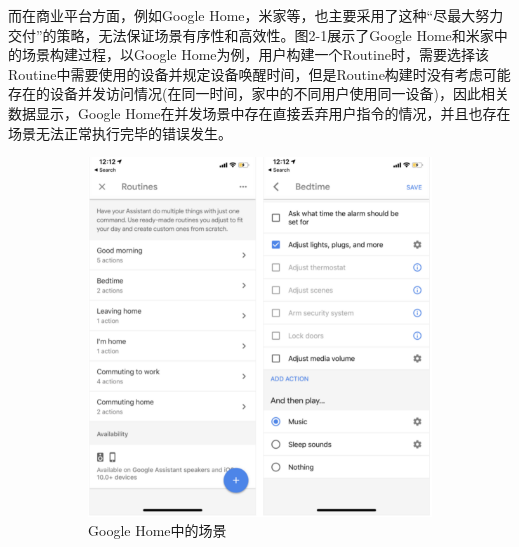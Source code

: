 \documentclass[winfonts,master,twoside]{njuthesis}
\begin{document}
而在商业平台方面，例如Google Home\cite{googlehome}，米家\cite{homemi}等，也主要采用了这种“尽最大努力交付”的策略，无法保证场景有序性和高效性\cite{celik2018soteria}。图2-1展示了Google Home和米家中的场景构建过程，以Google Home为例，用户构建一个Routine时，需要选择该Routine中需要使用的设备并规定设备唤醒时间，但是Routine构建时没有考虑可能存在的设备并发访问情况(在同一时间，家中的不同用户使用同一设备)，因此相关数据显示，Google Home在并发场景中存在直接丢弃用户指令的情况\cite{notworking}，并且也存在场景无法正常执行完毕的错误发生\cite{error}。
\begin{figure}[H]
	\begin{subfigure}{.5\textwidth}
		\centering
		\includegraphics[width=1\textwidth]{figure/2-relatework/google-home-routines.png}
		\caption{Google Home中的场景}
		\label{subfig:a}
	\end{subfigure}
	\begin{subfigure}{.5\textwidth}
		\centering

\end{subfigure}
\end{figure}
\end{document}
